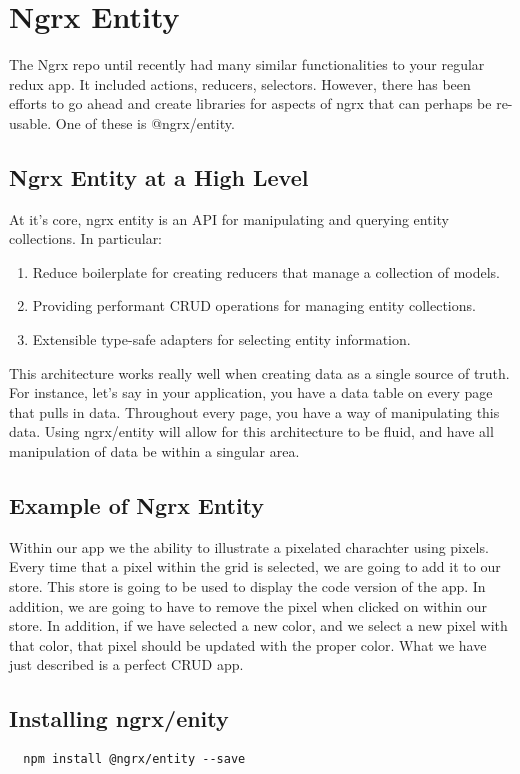
\chapter{ Ngrx Entity }

The Ngrx repo until recently had many similar functionalities to your regular
redux app. It included actions, reducers, selectors. However, there has been
efforts to go ahead and create libraries for aspects of ngrx that can perhaps
be re-usable. One of these is @ngrx/entity.

\section{ Ngrx Entity at a High Level }
At it's core, ngrx entity is an API for manipulating and querying entity
collections. In particular:
\begin{enumerate}
  \item Reduce boilerplate for creating reducers that manage a collection of
  models.
  \item Providing performant CRUD operations for managing entity collections.
  \item Extensible type-safe adapters for selecting entity information.
\end{enumerate}

This architecture works really well when creating data as a single source of
truth. For instance, let's say in your application, you have a data table on
every page that pulls in data. Throughout every page, you have a way of
manipulating this data. Using ngrx/entity will allow for this architecture to
be fluid, and have all manipulation of data be within a singular area.

\section{ Example of Ngrx Entity }
Within our app we the ability to illustrate a pixelated charachter using pixels.
Every time that a pixel within the grid is selected, we are going to add it to
our store. This store is going to be used to display the code version of the
app. In addition, we are going to have to remove the pixel when clicked on
within our store. In addition, if we have selected a new color, and we select a
new pixel with that color, that pixel should be updated with the proper color.
What we have just described is a perfect CRUD app.

\section{ Installing ngrx/enity }
\begin{verbatim}
  npm install @ngrx/entity --save
\end{verbatim}

